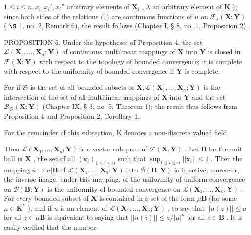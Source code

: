 \(1 \leqslant i \leqslant n, x_i, x_i', x_i''\) arbitrary elements of \(\mathbf{X}_i\) , \(\lambda\) an arbitrary element of \(\mathbf{K}\) ); since both sides of the relations (1) are continuous functions of \(u\) on \(\mathcal{F}_s(\mathbf{X}; \mathbf{Y})\) ( \(\S\) 1, no. 2, Remark 6), the result follows (Chapter I, § 8, no. 1, Proposition 2).

PROPOSITION 5. Under the hypotheses of Proposition 4, the set \(\mathcal{L}(\mathbf{X}_1,\ldots ,\mathbf{X}_n;\mathbf{Y})\) of continuous multilinear mappings of \(\mathbf{X}\) into \(\mathbf{Y}\) is closed in \(\mathcal{F}(\mathbf{X};\mathbf{Y})\) with respect to the topology of bounded convergence; it is complete with respect to the uniformity of bounded convergence if \(\mathbf{Y}\) is complete.

For if \(\mathfrak{S}\) is the set of all bounded subsets of \(\mathbf{X},\mathcal{L}(\mathbf{X}_1,\ldots ,\mathbf{X}_n;\mathbf{Y})\) is the intersection of the set of all multilinear mappings of \(\mathbf{X}\) into \(\mathbf{Y}\) and the set \(\mathcal{B}_{\mathfrak{S}}(\mathbf{X};\mathbf{Y})\) (Chapter IX, § 3, no. 5, Theorem 1); the result thus follows from Proposition 4 and Proposition 2, Corollary 1.

For the remainder of this subsection, K denotes a non-discrete valued field.

Then \(\mathcal{L}(\mathbf{X}_1, \ldots, \mathbf{X}_n; \mathbf{Y})\) is a vector subspace of \(\mathcal{F}(\mathbf{X}; \mathbf{Y})\) . Let \(\mathbf{B}\) be the unit ball in \(\mathbf{X}\) , the set of all \((\boldsymbol{x}_i)_{1 \leqslant i \leqslant n}\) such that \(\sup_{1 \leqslant i \leqslant n} ||\boldsymbol{x}_i|| \leqslant 1\) . Then the mapping \(u \to u|\mathbf{B}\) of \(\mathcal{L}(\mathbf{X}_1, \ldots, \mathbf{X}_n; \mathbf{Y})\) into \(\mathcal{B}(\mathbf{B}; \mathbf{Y})\) is injective; moreover, the inverse image, under this mapping, of the uniformity of uniform convergence on \(\mathcal{B}(\mathbf{B}; \mathbf{Y})\) is the uniformity of bounded convergence on \(\mathcal{L}(\mathbf{X}_1, \ldots, \mathbf{X}_n; \mathbf{Y})\) . For every bounded subset of \(\mathbf{X}\) is contained in a set of the form \(\mu\mathbf{B}\) (for some \(\mu \in \mathbf{K}^*\) ), and if \(u\) is an element of \(\mathcal{L}(\mathbf{X}_1, \ldots, \mathbf{X}_n; \mathbf{Y})\) , to say that \(||u(z)|| \leqslant a\) for all \(z \in \mu\mathbf{B}\) is equivalent to saying that \(||u(z)|| \leqslant a/|\mu|^n\) for all \(z \in \mathbf{B}\) . It is easily verified that the number


